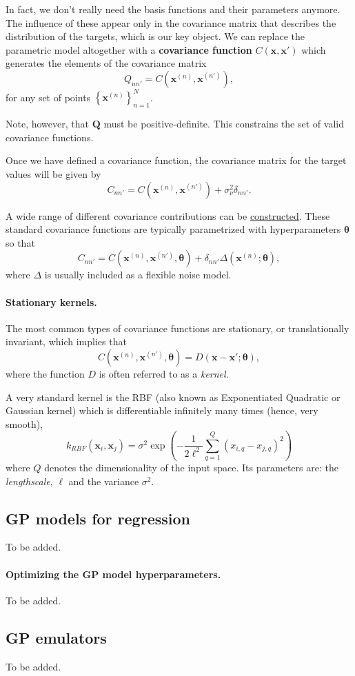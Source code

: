 \documentclass[%
oneside,                 %
final,                   %
10pt]{article}
\begin{document}
In fact, we don't really need the basis functions and their parameters anymore. The influence of these appear only in the covariance matrix that describes the distribution of the targets, which is our key object. We can replace the parametric model altogether with a \textbf{covariance function} $C( \boldsymbol{x}, \boldsymbol{x}' )$ which generates the  elements of the covariance matrix
\[
Q_{nn'} = C \left( \boldsymbol{x}^{(n)}, \boldsymbol{x}^{(n')} \right),
\]
for any set of points $\left\{ \boldsymbol{x}^{(n)} \right\}_{n=1}^N$.

Note, however, that $\boldsymbol{Q}$ must be positive-definite. This constrains the set of valid covariance functions.

Once we have defined a covariance function, the covariance matrix for the target values will be given by
\[
C_{nn'} = C \left( \boldsymbol{x}^{(n)}, \boldsymbol{x}^{(n')} \right) + \sigma_\nu^2 \delta_{nn'}.
\]

A wide range of different covariance contributions can be \href{{https://en.wikipedia.org/wiki/Gaussian_process#Covariance_functions}}{constructed}. These standard covariance functions are typically parametrized with hyperparameters $\boldsymbol{\theta}$ so that 
\[
C_{nn'} = C \left( \boldsymbol{x}^{(n)}, \boldsymbol{x}^{(n')}, \boldsymbol{\theta} \right) + \delta_{nn'} \Delta \left( \boldsymbol{x}^{(n)};  \boldsymbol{\theta} \right),
\]
where $\Delta$ is usually included as a flexible noise model.

\paragraph{Stationary kernels.}
The most common types of covariance functions are stationary, or translationally invariant, which implies that 
\[
C \left( \boldsymbol{x}^{(n)}, \boldsymbol{x}^{(n')}, \boldsymbol{\theta} \right) = D \left( \boldsymbol{x} - \boldsymbol{x}'; \boldsymbol{\theta} \right),
\]
where the function $D$ is often referred to as a \emph{kernel}.

A very standard kernel is the RBF (also known as Exponentiated Quadratic or Gaussian kernel) which is differentiable infinitely many times (hence, very smooth),
\[ k_{RBF}(\mathbf{x}_{i},\mathbf{x}_{j}) = \sigma^2 \exp \left( -\frac{1}{2\ell^2} \sum_{q=1}^Q (x_{i,q} - x_{j,q})^2\right) \]
where $Q$ denotes the dimensionality of the input space. Its parameters are: the \emph{lengthscale}, $\ell$ and the variance $\sigma^2$. 

\subsection{GP models for regression}
To be added.

\paragraph{Optimizing the GP model hyperparameters.}
To be added.

\subsection{GP emulators}

To be added.


\end{document}
